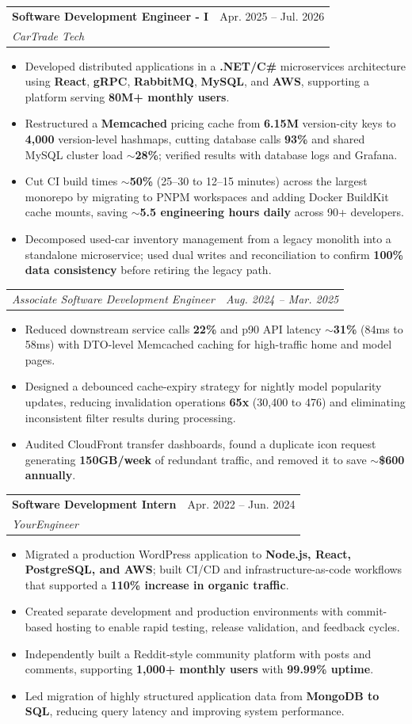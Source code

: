 \documentclass[letterpaper,11pt]{article}
\makeatletter
\newcommand{\resumeItem}[1]{
  \item\small{
    {#1 \vspace{-2pt}}
  }
}
\newcommand{\resumeSubheading}[4]{
  \vspace{-2pt}\item
    \begin{tabular*}{0.97\textwidth}[t]{l@{\extracolsep{\fill}}r}
      \textbf{#1} & #2 \\
      \textit{\small#3} & \textit{\small #4} \\
    \end{tabular*}\vspace{-7pt}
}
\newcommand{\resumeSubSubheading}[2]{
    \item
    \begin{tabular*}{0.97\textwidth}{l@{\extracolsep{\fill}}r}
      \textit{\small#1} & \textit{\small #2} \\
    \end{tabular*}\vspace{-7pt}
}
\newcommand{\resumeItemListStart}{\begin{itemize}}
\newcommand{\resumeItemListEnd}{\end{itemize}\vspace{-5pt}}
\makeatother
\begin{document}
\resumeSubheading
{Software Development Engineer - I}{Apr. 2025 -- Jul. 2026}
{CarTrade Tech}{ }
\resumeItemListStart
\resumeItem{Developed distributed applications in a \textbf{.NET/C\#} microservices architecture using \textbf{React}, \textbf{gRPC}, \textbf{RabbitMQ}, \textbf{MySQL}, and \textbf{AWS}, supporting a platform serving \textbf{80M+ monthly users}.}
\resumeItem{Restructured a \textbf{Memcached} pricing cache from \textbf{6.15M} version-city keys to \textbf{4,000} version-level hashmaps, cutting database calls \textbf{93\%} and shared MySQL cluster load \textbf{$\sim$28\%}; verified results with database logs and Grafana.}
\resumeItem{Cut CI build times \textbf{$\sim$50\%} (25--30 to 12--15 minutes) across the largest monorepo by migrating to PNPM workspaces and adding Docker BuildKit cache mounts, saving \textbf{$\sim$5.5 engineering hours daily} across 90+ developers.}
\resumeItem{Decomposed used-car inventory management from a legacy monolith into a standalone microservice; used dual writes and reconciliation to confirm \textbf{100\% data consistency} before retiring the legacy path.}
\resumeItemListEnd
\resumeSubSubheading
{Associate Software Development Engineer}{Aug. 2024 -- Mar. 2025}
\resumeItemListStart
\resumeItem{Reduced downstream service calls \textbf{22\%} and p90 API latency \textbf{$\sim$31\%} (84ms to 58ms) with DTO-level Memcached caching for high-traffic home and model pages.}
\resumeItem{Designed a debounced cache-expiry strategy for nightly model popularity updates, reducing invalidation operations \textbf{65x} (30,400 to 476) and eliminating inconsistent filter results during processing.}
\resumeItem{Audited CloudFront transfer dashboards, found a duplicate icon request generating \textbf{150GB/week} of redundant traffic, and removed it to save \textbf{$\sim$\$600 annually}.}
\resumeItemListEnd

\resumeSubheading
{Software Development Intern}{Apr. 2022 -- Jun. 2024}
{YourEngineer}{ }
\resumeItemListStart
\resumeItem{Migrated a production WordPress application to \textbf{Node.js, React, PostgreSQL, and AWS}; built CI/CD and infrastructure-as-code workflows that supported a \textbf{110\% increase in organic traffic}.}
\resumeItem{Created separate development and production environments with commit-based hosting to enable rapid testing, release validation, and feedback cycles.}
\resumeItem{Independently built a Reddit-style community platform with posts and comments, supporting \textbf{1,000+ monthly users} with \textbf{99.99\% uptime}.}
\resumeItem{Led migration of highly structured application data from \textbf{MongoDB to SQL}, reducing query latency and improving system performance.}
\resumeItemListEnd
\end{document}
